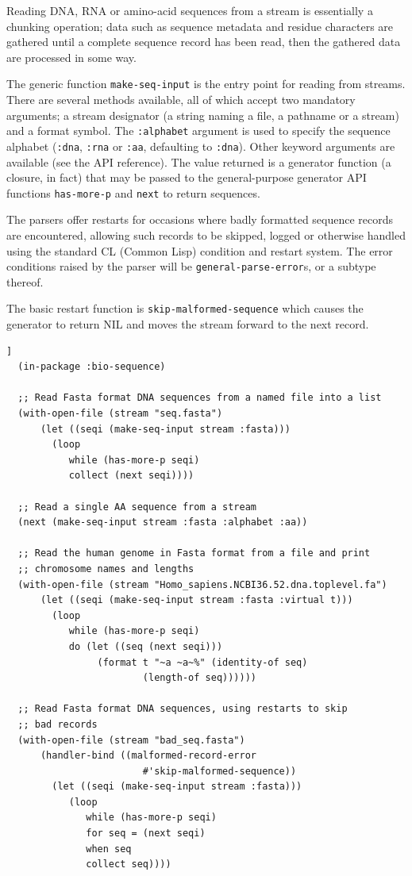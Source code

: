\documentclass[a4paper, 12pt]{article}
\begin{document}
Reading DNA, RNA or amino-acid sequences from a stream is essentially
a chunking operation; data such as sequence metadata and residue
characters are gathered until a complete sequence record has been
read, then the gathered data are processed in some way.

The generic function \lstinline!make-seq-input! is the entry point for
reading from streams. There are several methods available, all of
which accept two mandatory arguments; a stream designator (a string
naming a file, a pathname or a stream) and a format symbol. The
\lstinline!:alphabet! argument is used to specify the sequence
alphabet (\lstinline!:dna!, \lstinline!:rna! or \lstinline!:aa!,
defaulting to \lstinline!:dna!). Other keyword arguments are available
(see the API reference). The value returned is a generator function (a
closure, in fact) that may be passed to the general-purpose generator
API functions \lstinline!has-more-p! and \lstinline!next! to return
sequences.

The parsers offer restarts for occasions where badly formatted
sequence records are encountered, allowing such records to be skipped,
logged or otherwise handled using the standard CL (Common Lisp)
condition and restart system. The error conditions raised by the
parser will be \lstinline!general-parse-error!s, or a subtype thereof.

The basic restart function is \lstinline!skip-malformed-sequence!
which causes the generator to return NIL and moves the stream forward
to the next record.

\begin{lstlisting}[caption={Making sequences from streams},
  label=lst:read-bioseq-stream,float=[tbph]]
  (in-package :bio-sequence)
  
  ;; Read Fasta format DNA sequences from a named file into a list
  (with-open-file (stream "seq.fasta")
      (let ((seqi (make-seq-input stream :fasta)))
        (loop
           while (has-more-p seqi)
           collect (next seqi))))

  ;; Read a single AA sequence from a stream
  (next (make-seq-input stream :fasta :alphabet :aa))

  ;; Read the human genome in Fasta format from a file and print
  ;; chromosome names and lengths
  (with-open-file (stream "Homo_sapiens.NCBI36.52.dna.toplevel.fa")
      (let ((seqi (make-seq-input stream :fasta :virtual t)))
        (loop
           while (has-more-p seqi)
           do (let ((seq (next seqi)))
                (format t "~a ~a~%" (identity-of seq)
                        (length-of seq))))))

  ;; Read Fasta format DNA sequences, using restarts to skip
  ;; bad records
  (with-open-file (stream "bad_seq.fasta")
      (handler-bind ((malformed-record-error
                        #'skip-malformed-sequence))
        (let ((seqi (make-seq-input stream :fasta)))
           (loop
              while (has-more-p seqi)
              for seq = (next seqi)
              when seq
              collect seq))))
\end{lstlisting}
\end{document}
